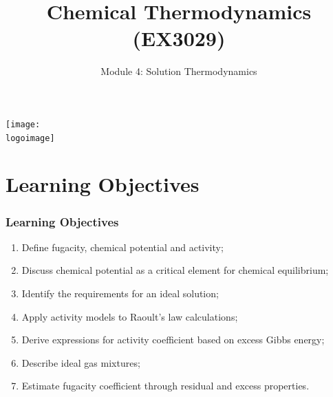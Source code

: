 \documentclass[10pt,compress,handout,ignorenonframetext,unknownkeysallowed]{beamer}
\institute{School of Engineering}
\title{Chemical Thermodynamics (EX3029)}
\subtitle{Module 4: Solution Thermodynamics}
\date[ ]{ }
\newcommand{\logoimage}{../../FigBanner/UoAHorizBanner}
\begin{document}
\begin{frame}
  \titlepage
  \vfill%
  \begin{center}
    \texttt{[image: \\logoimage]}
  \end{center}
\end{frame}





\section{Learning Objectives}

\begin{frame}
 \frametitle{Learning Objectives}
   \begin{enumerate}
     \item<1-> Define fugacity, chemical potential and activity; 
     \item<1-> Discuss chemical potential as a critical element for chemical equilibrium;
     \item<1-> Identify the requirements for an ideal solution;       
     \item<1-> Apply activity models to Raoult's law calculations;
     \item<1-> Derive expressions for activity coefficient based on excess Gibbs energy;
     \item<1-> Describe ideal gas mixtures;
     \item<1-> Estimate fugacity coefficient through residual and excess properties.
   \end{enumerate}

\end{frame}

\end{document}
